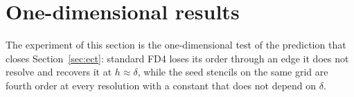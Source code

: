 \documentclass[11pt]{amsart}
\theoremstyle{definition}
\theoremstyle{remark}
\begin{document}
\section{One-dimensional results}
\label{sec:results1d}

The experiment of this section is the one-dimensional test of the
prediction that closes Section~\ref{sec:ect}: standard FD4 loses its order
through an edge it does not resolve and recovers it at $h \approx
\delta$, while the seed stencils on the same grid are fourth order at
every resolution with a constant that does not depend on $\delta$.
\end{document}
